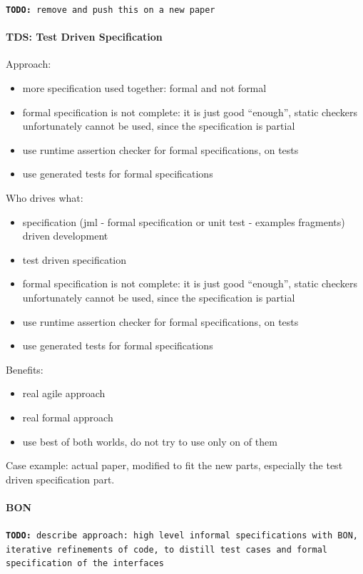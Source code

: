 \documentclass{article} \usepackage{times}
\newcommand{\todo}[1]{\texttt{\textbf{TODO:} #1}}
\begin{document}
\todo{remove and push this on a new paper}

\paragraph*{TDS: Test Driven Specification}

Approach:
\begin{itemize}
\item more specification used together: formal and not formal
\item formal specification is not complete: it is just good
  ``enough'', static checkers unfortunately cannot be used, since the
  specification is partial
\item use runtime assertion checker for formal specifications, on tests
\item use generated tests for formal specifications
\end{itemize}

Who drives what:
\begin{itemize}
\item specification (jml - formal specification or unit test -
  examples fragments) driven development
\item test driven specification
\item formal specification is not complete: it is just good
  ``enough'', static checkers unfortunately cannot be used, since the
  specification is partial
\item use runtime assertion checker for formal specifications, on tests
\item use generated tests for formal specifications
\end{itemize}

Benefits:
\begin{itemize}
\item real agile approach
\item real formal approach
\item use best of both worlds, do not try to use only on of them
\end{itemize}

Case example: actual paper, modified to fit the new parts, especially
the test driven specification part.

\paragraph*{BON}

\todo{describe approach: high level informal specifications with BON,
  iterative refinements of code, to distill test cases and formal
  specification of the interfaces}
\end{document}
